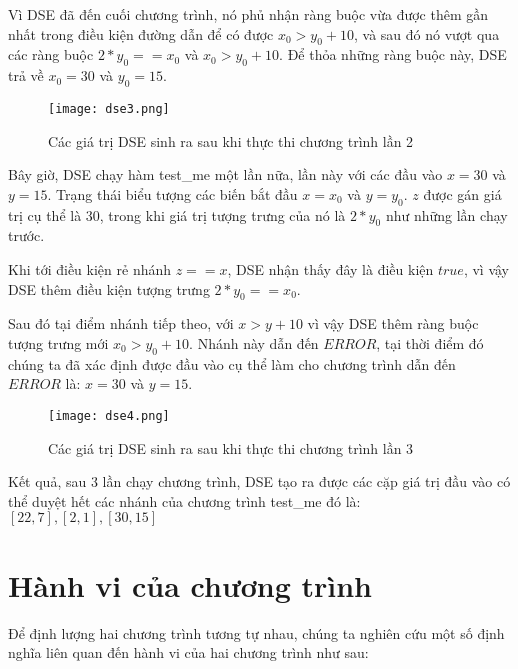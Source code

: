 Vì DSE đã đến cuối chương trình, nó phủ nhận ràng buộc vừa được thêm gần nhất trong điều kiện đường dẫn để có được $ x_{0} > y_{0} + 10 $, và sau đó nó vượt qua các ràng buộc $ 2*y_{0} == x_{0} $ và $ x_{0} > y_{0} + 10$. Để thỏa những ràng buộc này, DSE trả về $x_{0} = 30$ và $y_{0} = 15$.

\begin{center}
	\begin{figure}[H]
		\begin{center}
			\texttt{[image: dse3.png]}
		\end{center}
		\caption{Các giá trị DSE sinh ra sau khi thực thi chương trình lần 2}
		\label{dse3}
	\end{figure}
\end{center}

Bây giờ, DSE chạy hàm test\_me một lần nữa, lần này với các đầu vào $x = 30$ và $y = 15$. Trạng thái biểu tượng các biến bắt đầu $x = x_{0}$ và $y = y_{0}$. $z$ được gán giá trị cụ thể là $30$, trong khi giá trị tượng trưng của nó là $2*y_0$ như những lần chạy trước.

Khi tới điều kiện rẻ nhánh $z == x$, DSE nhận thấy đây là điều kiện $true$, vì vậy DSE thêm điều kiện tượng trưng $2*y_{0} == x_{0}$.

Sau đó tại điểm nhánh tiếp theo, với $x > y + 10$ vì vậy DSE thêm ràng buộc tượng trưng mới $ x_{0} > y_{0}+ 10 $. Nhánh này dẫn đến $ERROR$, tại thời điểm đó chúng ta đã xác định được đầu vào cụ thể làm cho chương trình dẫn đến $ERROR$ là: $x = 30$ và $y = 15$.

\begin{center}
	\begin{figure}[H]
		\begin{center}
			\texttt{[image: dse4.png]}
		\end{center}
		\caption{Các giá trị DSE sinh ra sau khi thực thi chương trình lần 3}
		\label{dse4}
	\end{figure}
\end{center}

Kết quả, sau 3 lần chạy chương trình, DSE tạo ra được các cặp giá trị đầu vào có thể duyệt hết các nhánh của chương trình test\_me đó là: $[22,7], [2,1], [30,15]$

\section{Hành vi của chương trình }
Để định lượng hai chương trình tương tự nhau, chúng ta nghiên cứu một số định nghĩa liên quan đến hành vi của hai chương trình như sau:
	
